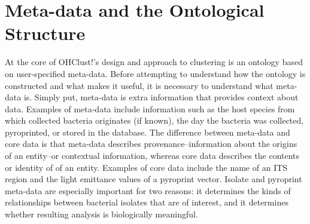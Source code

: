 \documentclass[12pt]{ucthesis}
\begin{document}
   \section{Meta-data and the Ontological Structure}\label{sec:ontology_structure}
      At the core of \textsf{OHClust!}'s design and approach to clustering is an
      ontology based on user-specified meta-data. Before attempting to understand
      how the ontology is constructed and what makes it useful, it is necessary
      to understand what meta-data is. Simply put, meta-data is extra information
      that provides context about data. Examples of meta-data include information
      such as the host species from which collected bacteria originates (if
      known), the day the bacteria was collected, pyroprinted, or stored in the
      database. The difference between meta-data and core data is that meta-data
      describes provenance--information about the origins of an entity--or
      contextual information, whereas core data describes the contents or identity
      of of an entity. Examples of core data include the name of an ITS region and
      the light emittance values of a pyroprint vector. Isolate and pyroprint
      meta-data are especially important for two reasons: it determines the kinds
      of relationships between bacterial isolates that are of interest, and it
      determines whether resulting analysis is biologically meaningful.
\end{document}
